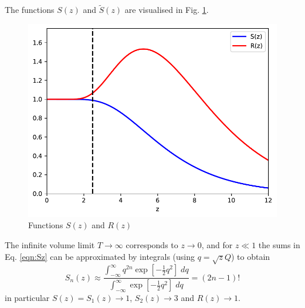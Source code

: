 \documentclass[11pt]{article}
\begin{document}
The functions $S(z)$ and $\tilde{S}(z)$ are visualised in Fig. \ref{fig:Splot}.
\begin{figure}
  \begin{center}
    \includegraphics[width=0.5\linewidth]{SandR.pdf}
    \caption{Functions $S(z)$ and $R(z)$}
    \label{fig:Splot}
  \end{center}
\end{figure}
The infinite volume limit $T\rightarrow\infty$ corresponds to $z\rightarrow 0$, and for $z\ll 1$ the sums in Eq. \eqref{eqn:Sz} can be approximated by integrals (using $q=\sqrt{z}Q$) to obtain
\begin{equation}
  S_n(z) \approx \frac{\int_{-\infty}^\infty q^{2n} \exp\left[-\frac{1}{2}q^2\right]\;dq}{\int_{-\infty}^\infty \exp\left[-\frac{1}{2}q^2\right]\;dq}=(2n-1)!
\end{equation}
in particular $S(z)=S_1(z)\rightarrow 1$, $S_2(z)\rightarrow 3$ and $R(z)\rightarrow 1$.
\end{document}
